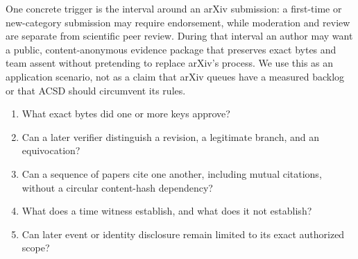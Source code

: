 \documentclass[11pt]{article}
\begin{document}
One concrete trigger is the interval around an arXiv submission: a first-time or
new-category submission may require endorsement, while moderation and review
are separate from scientific peer review. During that interval an author may
want a public, content-anonymous evidence package that preserves exact bytes
and team assent without pretending to replace arXiv's process. We use this as
an application scenario, not as a claim that arXiv queues have a measured
backlog or that ACSD should circumvent its rules.

\begin{enumerate}
  \item What exact bytes did one or more keys approve?
  \item Can a later verifier distinguish a revision, a legitimate branch, and an equivocation?
  \item Can a sequence of papers cite one another, including mutual citations, without a circular content-hash dependency?
  \item What does a time witness establish, and what does it not establish?
  \item Can later event or identity disclosure remain limited to its exact
        authorized scope?
\end{enumerate}
\end{document}
